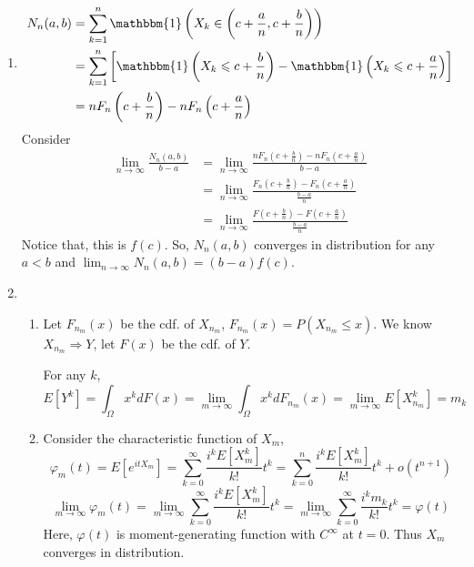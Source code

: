 \documentclass{article}
\begin{document}
\begin{enumerate}
		\item \begin{align*}
			N_n(a,b)
			& = \sum_{k=1}^n \mathbbm{1}\left(X_k\in\left(c+\frac{a}{n}, c+\frac{b}{n}\right)\right)\\
			& = \sum_{k=1}^n \left[\mathbbm{1}\left(X_k\leqslant c+\frac{b}{n}\right) - \mathbbm{1}\left(X_k\leqslant c+\frac{a}{n}\right)\right]\\
			& = nF_n\left(c+\frac{b}{n}\right)-nF_n\left(c+\frac{a}{n}\right)
		\end{align*}
		Consider \begin{align*}
			\lim_{n\to\infty} \frac{N_{n}(a,b)}{b-a}
			& = \lim_{n\to\infty} \frac{nF_n\left(c+\frac{b}{n}\right)-nF_n\left(c+\frac{a}{n}\right)}{b-a}\\
			& = \lim_{n\to\infty} \frac{F_n\left(c+\frac{b}{n}\right)-F_n\left(c+\frac{a}{n}\right)}{\frac{b-a}{n}}\\
			& = \lim_{n\to\infty} \frac{F\left(c+\frac{b}{n}\right)-F\left(c+\frac{a}{n}\right)}{\frac{b-a}{n}}
		\end{align*}
		Notice that, this is $f(c)$. So, $N_n(a,b)$ converges in distribution for any $a<b$ and $\lim_{n\to\infty} N_n(a,b) = (b-a)f(c)$.
		\item \begin{enumerate}[label=(\alph*)]
			\item Let $F_{n_m}(x)$ be the cdf. of $X_{n_m}$, $F_{n_m}(x) = P(X_{n_m} \leqslant x)$. We know $X_{n_m} \Rightarrow Y$, let $F(x)$ be the cdf. of $Y$.
			
			For any $k$, $$E[Y^k] 
			= \int_{\Omega} x^k dF(x)
			= \lim_{m\to \infty}\int_{\Omega} x^k dF_{n_m}(x)
			= \lim_{m\to\infty} E[X_{n_m}^k]
			= m_k$$
			\item Consider the characteristic function of $X_m$,
			$$\varphi_m(t)
			= E\left[e^{itX_m}\right]
			= \sum_{k=0}^\infty \frac{i^k E[X_m^k]}{k!} t^k
			= \sum_{k=0}^n \frac{i^k E[X_m^k]}{k!} t^k + o(t^{n+1})$$
			$$\lim_{m\to\infty}\varphi_{m}(t)
			=\lim_{m\to\infty} \sum_{k=0}^\infty \frac{i^k E[X_m^k]}{k!} t^k
			=\lim_{m\to\infty} \sum_{k=0}^\infty \frac{i^k m_k}{k!} t^k
			= \varphi(t)$$
			Here, $\varphi(t)$ is moment-generating function with $C^{\infty}$ at $t=0$. Thus $X_m$ converges in distribution.
		\end{enumerate}
	\end{enumerate}
\end{document}
